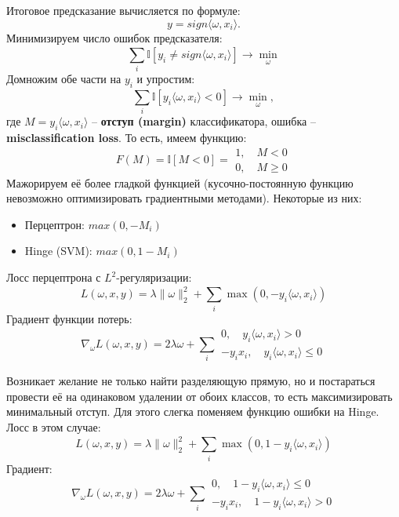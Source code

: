 \documentclass[a4paper, 10pt, openany]{book} %
\begin{document}
	Итоговое предсказание вычисляется по формуле:
	\begin{equation*}
		y = sign\langle \omega,x_i \rangle.
	\end{equation*}
	Минимизируем число ошибок предсказателя:
	\begin{equation*}
		\sum_{i}^{} \mathbb{I}[y_i \not= sign\langle \omega,x_i \rangle] \rightarrow \min_\omega
	\end{equation*}
	Домножим обе части на $y_i$ и упростим:
	\begin{equation*}
		\sum_{i}^{} \mathbb{I}[y_i\langle \omega,x_i \rangle < 0] \rightarrow \min_\omega,
	\end{equation*}
	где $M = y_i\langle \omega,x_i \rangle$ -- \textbf{отступ (margin)} классификатора, ошибка -- \textbf{misclassification loss}.
	То есть, имеем функцию:
	\begin{equation*}
		F(M) = \mathbb{I}[M < 0] = 
		\begin{gathered}
			1,\quad M < 0 \\
			0,\quad M \geq 0
		\end{gathered}
	\end{equation*}
	Мажорируем её более гладкой функцией (кусочно-постоянную функцию невозможно оптимизировать градиентными методами). Некоторые из них:
	\begin{itemize}
		\item Перцептрон: $max(0, -M_i)$
		\item Hinge (SVM): $max(0, 1-M_i)$
	\end{itemize}
	
	Лосс перцептрона с $L^2$-регуляризации:
	\begin{equation*}
		L(\omega, x, y) = \lambda \|\omega\|^2_2 + \sum_{i}^{} \max(0,-y_i\langle \omega, x_i \rangle)
	\end{equation*}
	Градиент функции потерь:
	\begin{equation*}
		\nabla_\omega L(\omega, x, y) = 2 \lambda \omega + \sum_{i}^{}
		\begin{gathered}
			0,\quad y_i\langle \omega, x_i \rangle > 0 \\
			- y_i x_i,\quad y_i\langle \omega, x_i \rangle \leq 0
		\end{gathered}
	\end{equation*}
	
	Возникает желание не только найти разделяющую прямую, но и постараться провести её на одинаковом удалении от обоих классов, то есть максимизировать минимальный отступ. Для этого слегка поменяем функцию ошибки на Hinge. Лосс в этом случае:
	\begin{equation*}
		L(\omega, x, y) = \lambda \|\omega\|^2_2 + \sum_{i}^{} \max(0, 1 - y_i\langle \omega, x_i \rangle)
	\end{equation*}
	Градиент:
	\begin{equation*}
		\nabla_\omega L(\omega, x, y) = 2 \lambda \omega + \sum_{i}^{}
		\begin{gathered}
			0,\quad 1 - y_i\langle \omega, x_i \rangle \leq 0 \\
			- y_i x_i,\quad 1 - y_i\langle \omega, x_i \rangle > 0
		\end{gathered}
	\end{equation*}
	
\end{document}
